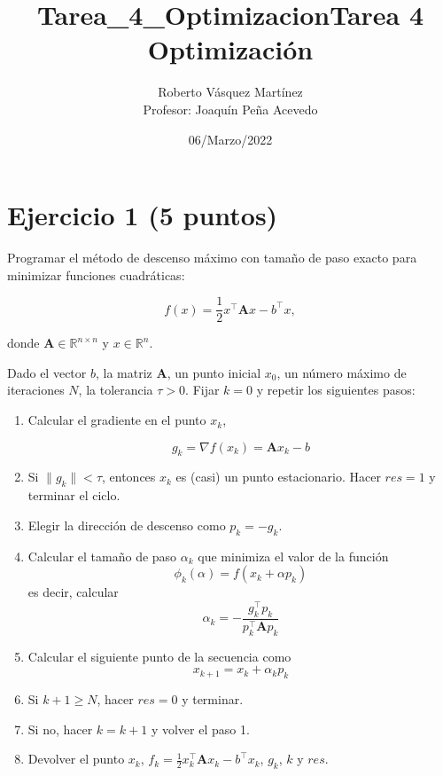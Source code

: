 \documentclass[11pt]{article}
\title{Tarea\_4\_Optimizacion}
\begin{document}
    \title{Tarea 4 Optimización}
    \author{Roberto Vásquez Martínez \\ Profesor: Joaquín Peña Acevedo}
    \date{06/Marzo/2022}
    \maketitle   
    
    

    
    \hypertarget{ejercicio-1-5-puntos}{%
\section{Ejercicio 1 (5 puntos)}\label{ejercicio-1-5-puntos}}

Programar el método de descenso máximo con tamaño de paso exacto para
minimizar funciones cuadráticas:

\[ f(x) = \frac{1}{2} x^\top \mathbf{A} x - b^\top x, \]

donde \(\mathbf{A} \in \mathbb{R}^{n \times n}\) y
\(x \in \mathbb{R}^n\).

Dado el vector \(b\), la matriz \(\mathbf{A}\), un punto inicial
\(x_0\), un número máximo de iteraciones \(N\), la tolerancia
\(\tau>0\). Fijar \(k=0\) y repetir los siguientes pasos:

\begin{enumerate}
\def\labelenumi{\arabic{enumi}.}
\item
  Calcular el gradiente en el punto \(x_k\),

  \[g_k = \nabla f(x_k) = \mathbf{A} x_k - b\]
\item
  Si \(\|g_k\| < \tau\), entonces \(x_k\) es (casi) un punto
  estacionario. Hacer \(res=1\) y terminar el ciclo.
\item
  Elegir la dirección de descenso como \(p_k = - g_k\).
\item
  Calcular el tamaño de paso \(\alpha_{k}\) que minimiza el valor de la
  función \[\phi_k(\alpha) =  f(x_k + \alpha p_k)\] es decir, calcular
  \[ \alpha_{k} = -\frac{ g_{k}^{\top} p_{k}}{ p_{k}^{\top}\mathbf{A}p_{k}} \]
\item
  Calcular el siguiente punto de la secuencia como
  \[x_{k+1} = x_k + \alpha_k p_k \]
\item
  Si \(k+1\geq N\), hacer \(res=0\) y terminar.
\item
  Si no, hacer \(k = k+1\) y volver el paso 1.
\item
  Devolver el punto \(x_k\),
  \(f_k= \frac{1}{2} x_k^\top \mathbf{A} x_k - b^\top x_k\), \(g_k\),
  \(k\) y \(res\).
\end{enumerate}
\end{document}
